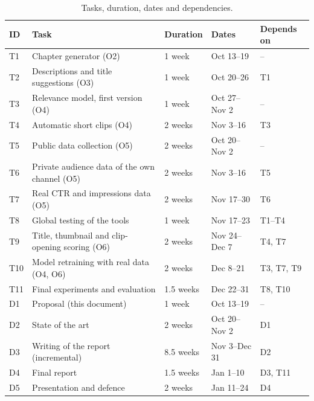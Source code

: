 \documentclass[ENG]{TFUOC}
\begin{document}
\begin{table}[H]
\centering
\caption{Tasks, duration, dates and dependencies.}
\label{tab:planning}
\small
\begin{tabular}{@{}lp{7.6cm}lll@{}}
\toprule
\textbf{ID} & \textbf{Task} & \textbf{Duration} & \textbf{Dates} & \textbf{Depends on} \\
\midrule
T1 & Chapter generator (O2) & 1 week & Oct 13--19 & -- \\
T2 & Descriptions and title suggestions (O3) & 1 week & Oct 20--26 & T1 \\
T3 & Relevance model, first version (O4) & 1 week & Oct 27--Nov 2 & -- \\
T4 & Automatic short clips (O4) & 2 weeks & Nov 3--16 & T3 \\
T5 & Public data collection (O5) & 2 weeks & Oct 20--Nov 2 & -- \\
T6 & Private audience data of the own channel (O5) & 2 weeks & Nov 3--16 & T5 \\
T7 & Real CTR and impressions data (O5) & 2 weeks & Nov 17--30 & T6 \\
T8 & Global testing of the tools & 1 week & Nov 17--23 & T1--T4 \\
T9 & Title, thumbnail and clip-opening scoring (O6) & 2 weeks & Nov 24--Dec 7 & T4, T7 \\
T10 & Model retraining with real data (O4, O6) & 2 weeks & Dec 8--21 & T3, T7, T9 \\
T11 & Final experiments and evaluation & 1.5 weeks & Dec 22--31 & T8, T10 \\
\midrule
D1 & Proposal (this document) & 1 week & Oct 13--19 & -- \\
D2 & State of the art & 2 weeks & Oct 20--Nov 2 & D1 \\
D3 & Writing of the report (incremental) & 8.5 weeks & Nov 3--Dec 31 & D2 \\
D4 & Final report & 1.5 weeks & Jan 1--10 & D3, T11 \\
D5 & Presentation and defence & 2 weeks & Jan 11--24 & D4 \\
\bottomrule
\end{tabular}
\end{table}
\end{document}
